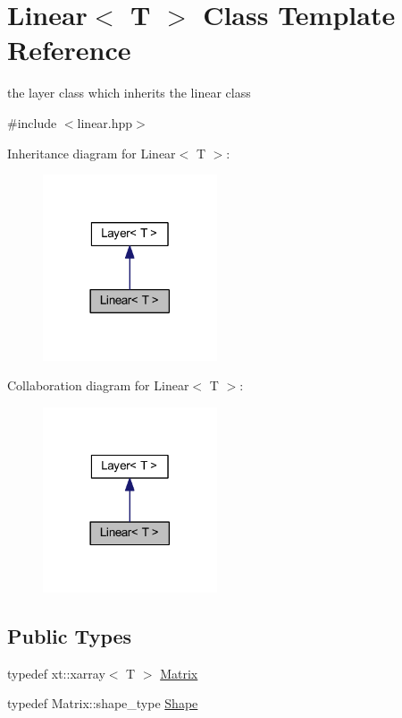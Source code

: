 \hypertarget{class_linear}{}\section{Linear$<$ T $>$ Class Template Reference}
\label{class_linear}


the layer class which inherits the linear class  




{\ttfamily \#include $<$linear.\+hpp$>$}



Inheritance diagram for Linear$<$ T $>$\+:\nopagebreak
\begin{figure}[H]
\begin{center}
\leavevmode
\includegraphics[width=146pt]{class_linear__inherit__graph}
\end{center}
\end{figure}


Collaboration diagram for Linear$<$ T $>$\+:\nopagebreak
\begin{figure}[H]
\begin{center}
\leavevmode
\includegraphics[width=146pt]{class_linear__coll__graph}
\end{center}
\end{figure}
\subsection*{Public Types}
\begin{DoxyCompactItemize}
\item 
typedef xt\+::xarray$<$ T $>$ \mbox{\hyperlink{class_linear_a8e402d70272bdb6406745f7ec4139f16}{Matrix}}
\item 
typedef Matrix\+::shape\+\_\+type \mbox{\hyperlink{class_linear_afeccdcd7a158d0fe034436e4eafae066}{Shape}}
\end{DoxyCompactItemize}

